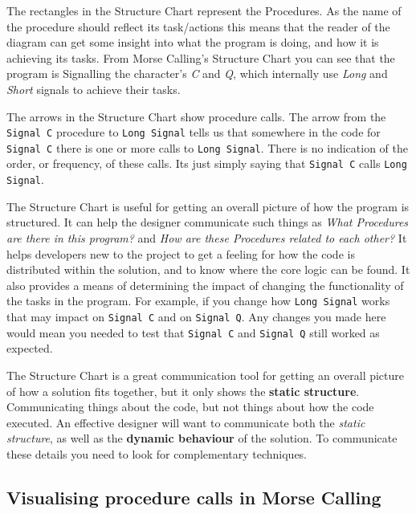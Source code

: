 The rectangles in the Structure Chart represent the Procedures. As the name of the procedure should reflect its task/actions this means that the reader of the diagram can get some insight into what the program is doing, and how it is achieving its tasks. From Morse Calling's Structure Chart you can see that the program is Signalling the character's \emph{C} and \emph{Q}, which internally use \emph{Long} and \emph{Short} signals to achieve their tasks.

The arrows in the Structure Chart show procedure calls. The arrow from the \texttt{Signal C} procedure to \texttt{Long Signal} tells us that somewhere in the code for \texttt{Signal C} there is one or more calls to \texttt{Long Signal}. There is no indication of the order, or frequency, of these calls. Its just simply saying that \texttt{Signal C} calls \texttt{Long Signal}.

The Structure Chart is useful for getting an overall picture of how the program is structured. It can help the designer communicate such things as \emph{What Procedures are there in this program?} and \emph{How are these Procedures related to each other?} It helps developers new to the project to get a feeling for how the code is distributed within the solution, and to know where the core logic can be found. It also provides a means of determining the impact of changing the functionality of the tasks in the program. For example, if you change how \texttt{Long Signal} works that may impact on \texttt{Signal C} and on \texttt{Signal Q}. Any changes you made here would mean you needed to test that \texttt{Signal C} and \texttt{Signal Q} still worked as expected.

\bigskip

The Structure Chart is a great communication tool for getting an overall picture of how a solution fits together, but it only shows the \textbf{static structure}. Communicating things about the code, but not things about how the code executed. An effective designer will want to communicate both the \emph{static structure}, as well as the \textbf{dynamic behaviour} of the solution. To communicate these details you need to look for complementary techniques.


\subsection{Visualising procedure calls in Morse Calling} %
\label{sub:visualising_procedure_calls_in_morse_calling}

